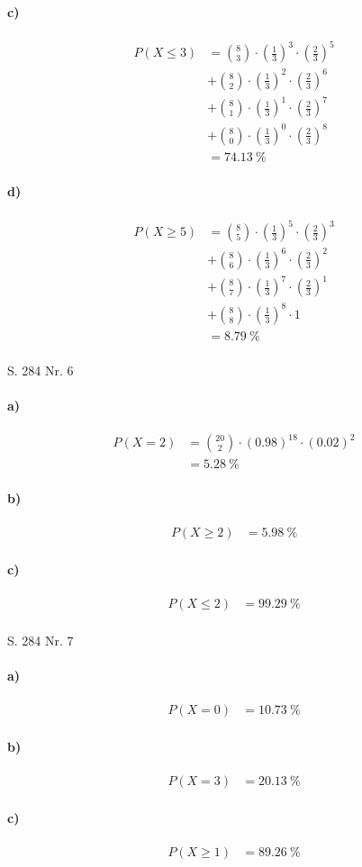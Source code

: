 \documentclass[12pt,a4paper]{report}
\begin{document}
	\paragraph{c)}
	\begin{align*}
		P(X \leq 3) &= \binom{8}{3} \cdot (\frac{1}{3})^3 \cdot (\frac{2}{3})^5 \\
		&+ \binom{8}{2} \cdot (\frac{1}{3})^2 \cdot (\frac{2}{3})^6 \\
		&+ \binom{8}{1} \cdot (\frac{1}{3})^1 \cdot (\frac{2}{3})^7 \\
		&+ \binom{8}{0} \cdot (\frac{1}{3})^0 \cdot (\frac{2}{3})^8 \\
		&= 74.13\ \%
	\end{align*}
	\paragraph{d)}
	\begin{align*}
		P(X \geq 5) &= \binom{8}{5} \cdot (\frac{1}{3})^5 \cdot (\frac{2}{3})^3 \\
		&+ \binom{8}{6} \cdot (\frac{1}{3})^6 \cdot (\frac{2}{3})^2 \\
		&+ \binom{8}{7} \cdot (\frac{1}{3})^7 \cdot (\frac{2}{3})^1 \\
		&+ \binom{8}{8} \cdot (\frac{1}{3})^8 \cdot 1 \\
		&= 8.79\ \%
	\end{align*}
	\noindent \\[0.75cm]
	\Large
	S. 284 Nr. 6
	\large
	\paragraph{a)}
	\begin{align*}
		P(X = 2) &= \binom{20}{2} \cdot (0.98)^{18} \cdot (0.02)^{2} \\
		&= 5.28\ \%
	\end{align*}
	\paragraph{b)}
	\begin{align*}
		P(X \geq 2) &= 5.98\ \%
	\end{align*}
	\paragraph{c)}
	\begin{align*}
		P(X \leq 2) &= 99.29\ \%
	\end{align*}
	\noindent \\[0.75cm]
	\Large
	S. 284 Nr. 7
	\large
	\paragraph{a)}
	\begin{align*}
		P(X = 0) &= 10.73\ \%
	\end{align*}
	\paragraph{b)}
	\begin{align*}
		P(X = 3) &= 20.13\ \%
	\end{align*}
	\paragraph{c)}
	\begin{align*}
		P(X \geq 1) &= 89.26\ \%
	\end{align*}
\end{document}
